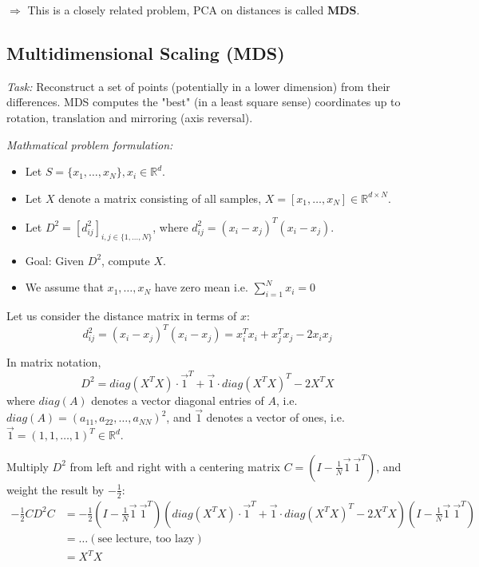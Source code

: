 \documentclass{scrartcl}
\begin{document}
\(\Rightarrow\) This is a closely related problem, PCA on distances is called \textbf{MDS}.

\subsection{Multidimensional Scaling (MDS)}
\textit{Task:} Reconstruct a set of points (potentially in a lower dimension) from their differences. MDS computes the "best" (in a least square sense) coordinates up to rotation, translation and mirroring (axis reversal).

\textit{Mathmatical problem formulation:}
\begin{itemize}
    \item
        Let \(S = \{x_1, \dots, x_N\}, x_i \in \mathbb{R}^d\). 
    \item
        Let \(X\) denote a matrix consisting of all samples, \(X=[x_1, \dots, x_N] \in \mathbb{R}^{d \times N}\).
    \item
        Let \(D^2 = [d_{ij}^2]_{i, j \in \{1, \dots, N\}}\), where \(d_{ij}^2 = (x_i - x_j)^T (x_i - x_j)\). 
    \item
        Goal: Given \(D^2\), compute \(X\).
    \item
        We assume that \(x_1, \dots, x_N\) have zero mean i.e. \(\sum_{i=1}^N x_i = 0\)
\end{itemize}

Let us consider the distance matrix in terms of \(x\):
\[d_{ij}^2 = (x_i - x_j)^T(x_i - x_j)=x_i^T x_i + x_j^T x_j - 2 x_i x_j\]

In matrix notation,
\[D^2 = diag(X^T X) \cdot \vec{1}^T + \vec{1} \cdot diag(X^T X)^T - 2X^TX\]
where \(diag(A)\) denotes a vector diagonal entries of \(A\), i.e. \(diag(A) = (a_{11}, a_{22}, \dots, a_{NN})^2\), and \(\vec{1}\) denotes a vector of ones, i.e. \(\vec{1} = (1,1,\dots,1)^T \in \mathbb{R}^d\).

Multiply \(D^2\) from left and right with a centering matrix \(C = (I - \frac{1}{N} \vec{1} \ \vec{1}^T)\), and weight the result by \(-\frac{1}{2}\):
\begin{align*}
    -\frac{1}{2} C D^2 C &= -\frac{1}{2} (I- \frac{1}{N} \vec{1} \ \vec{1}^T) (diag(X^T X) \cdot \vec{1}^T + \vec{1} \cdot diag(X^T X)^T - 2X^TX)(I- \frac{1}{N} \vec{1} \ \vec{1}^T)\\
    &= \dots (\text{see lecture, too lazy}) \\
    &= X^T X
\end{align*}
\end{document}
